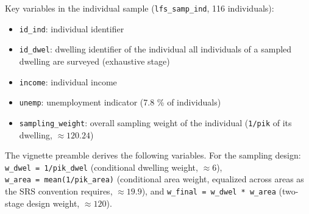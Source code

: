 \documentclass[
]{article}
\newenvironment{Shaded}{\begin{snugshade}}{\end{snugshade}}
\newcommand{\AttributeTok}[1]{\textcolor[rgb]{0.13,0.29,0.53}{#1}}
\newcommand{\DecValTok}[1]{\textcolor[rgb]{0.00,0.00,0.81}{#1}}
\newcommand{\FunctionTok}[1]{\textcolor[rgb]{0.13,0.29,0.53}{\textbf{#1}}}
\newcommand{\NormalTok}[1]{#1}
\newcommand{\OtherTok}[1]{\textcolor[rgb]{0.56,0.35,0.01}{#1}}
\newcommand{\SpecialCharTok}[1]{\textcolor[rgb]{0.81,0.36,0.00}{\textbf{#1}}}
\newcommand{\StringTok}[1]{\textcolor[rgb]{0.31,0.60,0.02}{#1}}
\providecommand{\tightlist}{%
  \setlength{\itemsep}{0pt}\setlength{\parskip}{0pt}}
\begin{document}
Key variables in the individual sample (\texttt{lfs\_samp\_ind}, 116
individuals):

\begin{itemize}
\tightlist
\item
  \texttt{id\_ind}: individual identifier
\item
  \texttt{id\_dwel}: dwelling identifier of the individual all
  individuals of a sampled dwelling are surveyed (exhaustive stage)
\item
  \texttt{income}: individual income
\item
  \texttt{unemp}: unemployment indicator (7.8 \% of individuals)
\item
  \texttt{sampling\_weight}: overall sampling weight of the individual
  (\texttt{1/pik} of its dwelling, \(\approx 120.24\))
\end{itemize}

The vignette preamble derives the following variables. For the sampling
design: \texttt{w\_dwel\ =\ 1/pik\_dwel} (conditional dwelling weight,
\(\approx 6\)), \texttt{w\_area\ =\ mean(1/pik\_area)} (conditional area
weight, equalized across areas as the SRS convention requires,
\(\approx 19.9\)), and \texttt{w\_final\ =\ w\_dwel\ *\ w\_area}
(two-stage design weight, \(\approx 120\)).

\begin{Shaded}
\end{Shaded}
\end{document}
